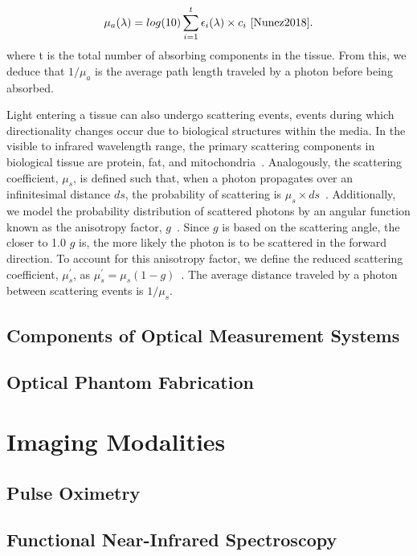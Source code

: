 \begin{equation}
    \mu_a(\lambda) = log(10) \sum_{i=1}^{t}\epsilon_i(\lambda)\times c_i~\cite{Nunez2018}. 
\end{equation}
where t is the total number of absorbing components in the tissue. From this, we deduce that $1/\mu_a$ is the average path length traveled by a photon before being absorbed. 

Light entering a tissue can also undergo scattering events, events during which directionality changes occur due to biological structures within the media. In the visible to infrared wavelength range, the primary scattering components in biological tissue are protein, fat, and mitochondria~\cite{Du2006, Pogue2006}. Analogously, the scattering coefficient, $\mu_s$, is defined such that, when a photon propagates over an infinitesimal distance $ds$, the probability of scattering is $\mu_s\times ds$~\cite{Welch2010}. Additionally, we model the probability distribution of scattered photons by an angular function known as the anisotropy factor, $g$~\cite{Wang2009}. Since $g$ is based on the scattering angle, the closer to 1.0 $g$ is, the more likely the photon is to be scattered in the forward direction. To account for this anisotropy factor, we define the reduced scattering coefficient, $\mu_s^'$, as 
$\mu_s^{'} = \mu_s(1-g)$~\cite{Wang2009}. The average distance traveled by a photon between scattering events is $1/\mu_s$.

\subsection{Components of Optical Measurement Systems}
\subsection{Optical Phantom Fabrication}



\section{Imaging Modalities}
\label{chap:background:modalities}
\subsection{Pulse Oximetry}
\subsection{Functional Near-Infrared Spectroscopy}
